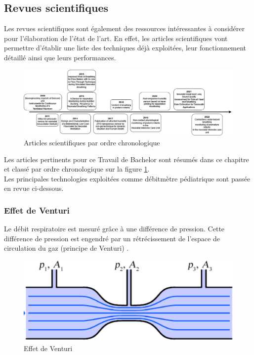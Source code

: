 \subsection{Revues scientifiques}
Les revues scientifiques sont également des ressources intéressantes à considérer pour l'élaboration de l'état de l'art. En effet, les 
articles scientifiques vont permettre d'établir une liste des techniques déjà exploitées, leur fonctionnement détaillé ainsi que leurs 
performances. \\
\begin{figure}[H]
    \hspace{-1cm}
    \includegraphics[scale = 0.45]{images/DRP_Etat_de_l_art.png}
    \caption{Articles scientifiques par ordre chronologique}
    \label{fig:articlesChrono}
\end{figure}

Les articles pertinents pour ce Travail de Bachelor sont résumés dans ce chapitre et classé par ordre chronologique sur la figure 
\ref{fig:articlesChrono}. \\

Les principales technologies exploitées comme débitmètre pédiatrique sont passée en revue ci-dessous. 

\subsubsection{Effet de Venturi}
Le débit respiratoire est mesuré grâce à une différence de pression. Cette différence de pression est engendré par un rétrécissement de 
l'espace de circulation du gaz (principe de Venturi) \cite{oberg_biomedical_2011}. 
\begin{figure}[H]
    \centering
    \includegraphics[scale = 0.5]{assets/figures/Venturi.png}
    \caption{Effet de Venturi \cite{oberg_biomedical_2011}}
    \label{fig:venturi}
\end{figure}

